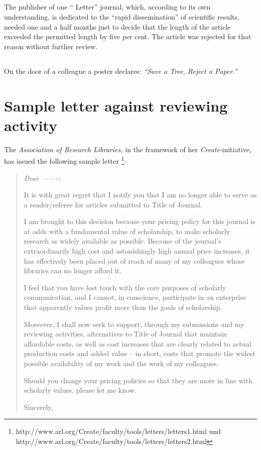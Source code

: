 \subsection{} The publisher of one `` Letter'' journal, which, according to
its own understanding, is dedicated to the ``rapid dissemination'' of
scientific results, needed one and a half months just to decide that the
length of the article exceeded the permitted length by five per cent.
The article was rejected for that reason without further review.


\subsection{} On the door of a colleague a poster declares:  {\em
``Save a Tree, Reject a Paper.''}

\section{Sample letter against reviewing activity}

 The {\it Association of Research Libraries,} in the framework of her {\it Create}-initiative, has issued the following sample letter
\footnote{
http://www.arl.org/Create/faculty/tools/letters/letters1.html
und \\
http://www.arl.org/Create/faculty/tools/letters/letters2.html
}:

\begin{quote}
{\em
Dear -------:

It is with great regret that I notify you that I am no longer able to serve as a reader/referee for articles submitted to Title of Journal.

I am brought to this decision because your pricing policy for this journal is at odds with a fundamental value of scholarship, to make scholarly research as widely available as possible. Because of the journal's extraordinarily high cost and astonishingly high annual price increases, it has effectively been placed out of reach of many of my colleagues whose libraries can no longer afford it.

      I feel that you have lost touch with the core purposes of scholarly communication, and I cannot, in conscience, participate in an enterprise that apparently values profit more than the goals of scholarship.

      Moreover, I shall now seek to support, through my submissions and my reviewing activities, alternatives to Title of Journal that maintain affordable costs, as well as cost increases that are clearly related to actual production costs and added value -- in short, costs that promote the widest possible availability of my work and the work of my colleagues.

      Should you change your pricing policies so that they are more in line with scholarly values, please let me know.

      Sincerely,
}
\end{quote}


